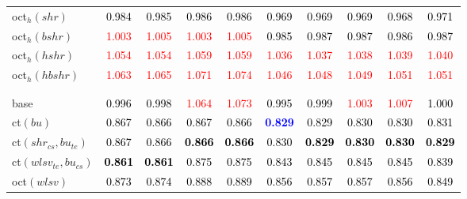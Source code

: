 \begin{tabular}[t]{l|ccccccccc}
oct$_h(shr)$ & \textcolor{black}{0.984} & \textcolor{black}{0.985} & \textcolor{black}{0.986} & \textcolor{black}{0.986} & \textcolor{black}{0.969} & \textcolor{black}{0.969} & \textcolor{black}{0.969} & \textcolor{black}{0.968} & \textcolor{black}{0.971}\\
oct$_h(bshr)$ & \textcolor{red}{1.003} & \textcolor{red}{1.005} & \textcolor{red}{1.003} & \textcolor{red}{1.005} & \textcolor{black}{0.985} & \textcolor{black}{0.987} & \textcolor{black}{0.987} & \textcolor{black}{0.986} & \textcolor{black}{0.987}\\
oct$_h(hshr)$ & \textcolor{red}{1.054} & \textcolor{red}{1.054} & \textcolor{red}{1.059} & \textcolor{red}{1.059} & \textcolor{red}{1.036} & \textcolor{red}{1.037} & \textcolor{red}{1.038} & \textcolor{red}{1.039} & \textcolor{red}{1.040}\\
oct$_h(hbshr)$ & \textcolor{red}{1.063} & \textcolor{red}{1.065} & \textcolor{red}{1.071} & \textcolor{red}{1.074} & \textcolor{red}{1.046} & \textcolor{red}{1.048} & \textcolor{red}{1.049} & \textcolor{red}{1.051} & \textcolor{red}{1.051}\\[-1.5ex]
\hline\\[-1.5ex]
\addlinespace[0.3em]
\multicolumn{10}{c}{\textbf{$k = 2$}}\\
base & \textcolor{black}{0.996} & \textcolor{black}{0.998} & \textcolor{red}{1.064} & \textcolor{red}{1.073} & \textcolor{black}{0.995} & \textcolor{black}{0.999} & \textcolor{red}{1.003} & \textcolor{red}{1.007} & \textcolor{black}{1.000}\\
ct$(bu)$ & \textcolor{black}{0.867} & \textcolor{black}{0.866} & \textcolor{black}{0.867} & \textcolor{black}{0.866} & \textcolor{blue}{\textbf{0.829}} & \textcolor{black}{0.829} & \textcolor{black}{0.830} & \textcolor{black}{0.830} & \textcolor{black}{0.831}\\
ct$(shr_{cs}, bu_{te})$ & \textcolor{black}{0.867} & \textcolor{black}{0.866} & \textcolor{black}{\textbf{0.866}} & \textcolor{black}{\textbf{0.866}} & \textcolor{black}{0.830} & \textcolor{black}{\textbf{0.829}} & \textcolor{black}{\textbf{0.830}} & \textcolor{black}{\textbf{0.830}} & \textcolor{black}{\textbf{0.829}}\\
ct$(wlsv_{te}, bu_{cs})$ & \textcolor{black}{\textbf{0.861}} & \textcolor{black}{\textbf{0.861}} & \textcolor{black}{0.875} & \textcolor{black}{0.875} & \textcolor{black}{0.843} & \textcolor{black}{0.845} & \textcolor{black}{0.845} & \textcolor{black}{0.845} & \textcolor{black}{0.839}\\
oct$(wlsv)$ & \textcolor{black}{0.873} & \textcolor{black}{0.874} & \textcolor{black}{0.888} & \textcolor{black}{0.889} & \textcolor{black}{0.856} & \textcolor{black}{0.857} & \textcolor{black}{0.857} & \textcolor{black}{0.856} & \textcolor{black}{0.849}\\

\end{tabular}
